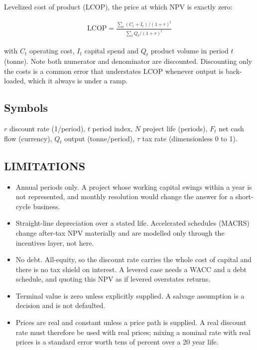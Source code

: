 \documentclass[10pt,a4paper,twoside]{report}
\begin{document}
Levelized cost of product (LCOP), the price at which NPV is exactly zero:

\begin{equation*}
\begin{gathered}
\mathrm{LCOP} = \frac{\sum_t (C_t + I_t)/(1+r)^t}{\sum_t Q_t/(1+r)^t}
\end{gathered}
\end{equation*}

with $C_t$ operating cost, $I_t$ capital spend and $Q_t$ product volume in period $t$ (tonne). Note both numerator and denominator are discounted. Discounting only the costs is a common error that understates LCOP whenever output is back-loaded, which it always is under a ramp.

\subsection*{Symbols}

$r$ discount rate (1/period), $t$ period index, $N$ project life (periods), $F_t$ net cash flow (currency), $Q_t$ output (tonne/period), $\tau$ tax rate (dimensionless 0 to 1).

\subsection*{LIMITATIONS}

\begin{itemize}
\item Annual periods only. A project whose working capital swings within a year is not represented, and monthly resolution would change the answer for a short-cycle business.
\item Straight-line depreciation over a stated life. Accelerated schedules (MACRS) change after-tax NPV materially and are modelled only through the incentives layer, not here.
\item No debt. All-equity, so the discount rate carries the whole cost of capital and there is no tax shield on interest. A levered case needs a WACC and a debt schedule, and quoting this NPV as if levered overstates returns.
\item Terminal value is zero unless explicitly supplied. A salvage assumption is a decision and is not defaulted.
\item Prices are real and constant unless a price path is supplied. A real discount rate must therefore be used with real prices; mixing a nominal rate with real prices is a standard error worth tens of percent over a 20 year life.
\end{itemize}
\end{document}
